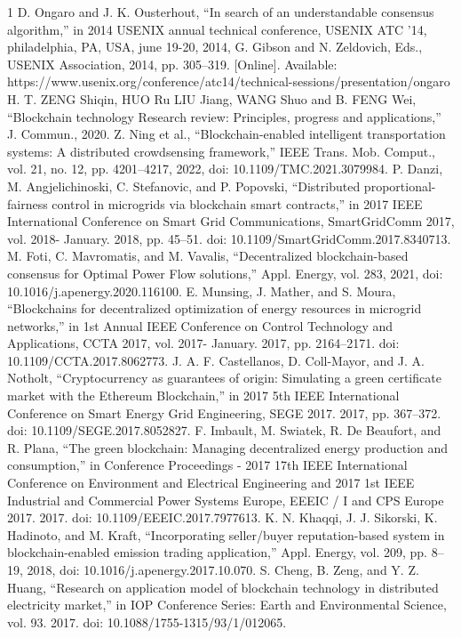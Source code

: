 \documentclass[lettersize,journal]{IEEEtran}
\begin{document}
\begin{thebibliography}{1}
\bibitem{}D. Ongaro and J. K. Ousterhout, “In search of an understandable consensus algorithm,” in 2014 USENIX annual technical conference, USENIX ATC ’14, philadelphia, PA, USA, june 19-20, 2014, G. Gibson and N. Zeldovich, Eds., USENIX Association, 2014, pp. 305–319. [Online]. Available: https://www.usenix.org/conference/atc14/technical-sessions/presentation/ongaro
\bibitem{}H. T. ZENG Shiqin, HUO Ru LIU Jiang, WANG Shuo and B. FENG Wei, “Blockchain technology Research review: Principles, progress and applications,” J. Commun., 2020.
\bibitem{}Z. Ning et al., “Blockchain-enabled intelligent transportation systems: A distributed crowdsensing framework,” IEEE Trans. Mob. Comput., vol. 21, no. 12, pp. 4201–4217, 2022, doi: 10.1109/TMC.2021.3079984.
\bibitem{}P. Danzi, M. Angjelichinoski, C. Stefanovic, and P. Popovski, “Distributed proportional-fairness control in microgrids via blockchain smart contracts,” in 2017 IEEE International Conference on Smart Grid Communications, SmartGridComm 2017, vol. 2018- January. 2018, pp. 45–51. doi: 10.1109/SmartGridComm.2017.8340713.
\bibitem{}M. Foti, C. Mavromatis, and M. Vavalis, “Decentralized blockchain-based consensus for Optimal Power Flow solutions,” Appl. Energy, vol. 283, 2021, doi: 10.1016/j.apenergy.2020.116100.
\bibitem{}E. Munsing, J. Mather, and S. Moura, “Blockchains for decentralized optimization of energy resources in microgrid networks,” in 1st Annual IEEE Conference on Control Technology and Applications, CCTA 2017, vol. 2017- January. 2017, pp. 2164–2171. doi: 10.1109/CCTA.2017.8062773.
\bibitem{}J. A. F. Castellanos, D. Coll-Mayor, and J. A. Notholt, “Cryptocurrency as guarantees of origin: Simulating a green certificate market with the Ethereum Blockchain,” in 2017 5th IEEE International Conference on Smart Energy Grid Engineering, SEGE 2017. 2017, pp. 367–372. doi: 10.1109/SEGE.2017.8052827.
\bibitem{}F. Imbault, M. Swiatek, R. De Beaufort, and R. Plana, “The green blockchain: Managing decentralized energy production and consumption,” in Conference Proceedings - 2017 17th IEEE International Conference on Environment and Electrical Engineering and 2017 1st IEEE Industrial and Commercial Power Systems Europe, EEEIC / I and CPS Europe 2017. 2017. doi: 10.1109/EEEIC.2017.7977613.
\bibitem{}K. N. Khaqqi, J. J. Sikorski, K. Hadinoto, and M. Kraft, “Incorporating seller/buyer reputation-based system in blockchain-enabled emission trading application,” Appl. Energy, vol. 209, pp. 8–19, 2018, doi: 10.1016/j.apenergy.2017.10.070.
\bibitem{}S. Cheng, B. Zeng, and Y. Z. Huang, “Research on application model of blockchain technology in distributed electricity market,” in IOP Conference Series: Earth and Environmental Science, vol. 93. 2017. doi: 10.1088/1755-1315/93/1/012065.

\end{thebibliography}
\end{document}

